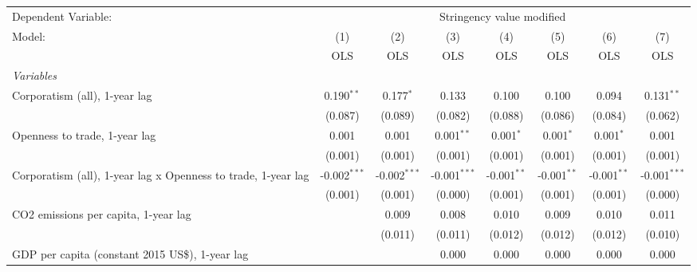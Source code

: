 
\begingroup
\centering
\begin{tabular}{lccccccc}
   \toprule
   Dependent Variable: & \multicolumn{7}{c}{Stringency value modified}\\
   Model:                                                        & (1)            & (2)            & (3)            & (4)           & (5)           & (6)           & (7)\\  
                                                                 &  OLS           & OLS            & OLS            & OLS           & OLS           & OLS           & OLS\\  
   \midrule
   \emph{Variables}\\
   Corporatism (all), 1-year lag                                 & 0.190$^{**}$   & 0.177$^{*}$    & 0.133          & 0.100         & 0.100         & 0.094         & 0.131$^{**}$\\   
                                                                 & (0.087)        & (0.089)        & (0.082)        & (0.088)       & (0.086)       & (0.084)       & (0.062)\\   
   Openness to trade, 1-year lag                                 & 0.001          & 0.001          & 0.001$^{**}$   & 0.001$^{*}$   & 0.001$^{*}$   & 0.001$^{*}$   & 0.001\\   
                                                                 & (0.001)        & (0.001)        & (0.001)        & (0.001)       & (0.001)       & (0.001)       & (0.001)\\   
   Corporatism (all), 1-year lag x Openness to trade, 1-year lag & -0.002$^{***}$ & -0.002$^{***}$ & -0.001$^{***}$ & -0.001$^{**}$ & -0.001$^{**}$ & -0.001$^{**}$ & -0.001$^{***}$\\   
                                                                 & (0.001)        & (0.001)        & (0.000)        & (0.001)       & (0.001)       & (0.001)       & (0.000)\\   
   CO2 emissions per capita, 1-year lag                          &                & 0.009          & 0.008          & 0.010         & 0.009         & 0.010         & 0.011\\   
                                                                 &                & (0.011)        & (0.011)        & (0.012)       & (0.012)       & (0.012)       & (0.010)\\   
   GDP per capita (constant 2015 US\$), 1-year lag               &                &                & 0.000          & 0.000         & 0.000         & 0.000         & 0.000\\   

\end{tabular}
